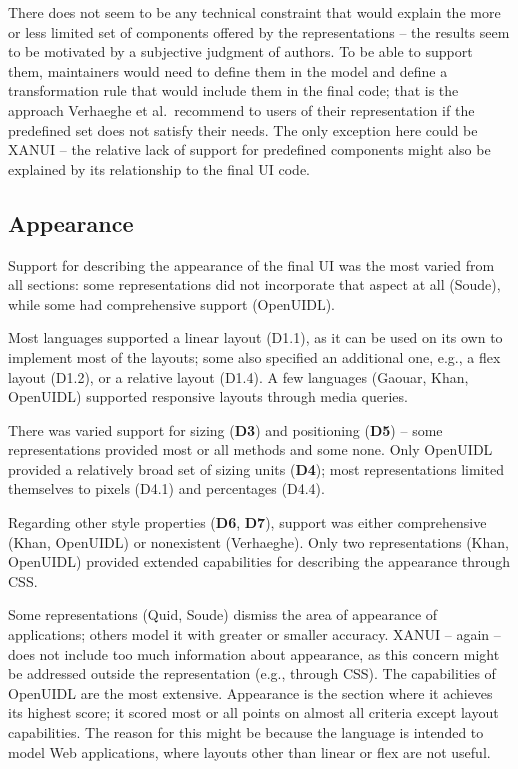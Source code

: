 There does not seem to be any technical constraint that would explain the more or less limited set of components offered by the representations -- the results seem to be motivated by a subjective judgment of authors.
To be able to support them, maintainers would need to define them in the model and define a transformation rule that would include them in the final code;
that is the approach Verhaeghe et al.\ recommend to users of their representation if the predefined set does not satisfy their needs.
The only exception here could be XANUI -- the relative lack of support for predefined components might also be explained by its relationship to the final UI code.

\subsection{Appearance}\label{subsec:4-2-appearance}
Support for describing the appearance of the final UI was the most varied from all sections: some representations did not incorporate that aspect at all (Soude), while some had comprehensive support (OpenUIDL).

Most languages supported a linear layout (D1.1), as it can be used on its own to implement most of the layouts;
some also specified an additional one, e.g., a flex layout (D1.2), or a relative layout (D1.4).
A few languages (Gaouar, Khan, OpenUIDL) supported responsive layouts through media queries.

There was varied support for sizing (\textbf{D3}) and positioning (\textbf{D5}) -- some representations provided most or all methods and some none.
Only OpenUIDL provided a relatively broad set of sizing units (\textbf{D4});
most representations limited themselves to pixels (D4.1) and percentages (D4.4).

Regarding other style properties (\textbf{D6}, \textbf{D7}), support was either comprehensive (Khan, OpenUIDL) or nonexistent (Verhaeghe).
Only two representations (Khan, OpenUIDL) provided extended capabilities for describing the appearance through CSS\@.

Some representations (Quid, Soude) dismiss the area of appearance of applications;
others model it with greater or smaller accuracy.
XANUI -- again -- does not include too much information about appearance, as this concern might be addressed outside the representation (e.g., through CSS).
The capabilities of OpenUIDL are the most extensive.
Appearance is the section where it achieves its highest score;
it scored most or all points on almost all criteria except layout capabilities.
The reason for this might be because the language is intended to model Web applications, where layouts other than linear or flex are not useful.

